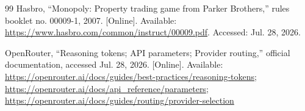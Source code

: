 \documentclass[conference]{IEEEtran}
\begin{document}
\begin{thebibliography}{99}
Hasbro, ``Monopoly: Property trading game from Parker Brothers,'' rules
booklet no. 00009-1, 2007. [Online]. Available:
\url{https://www.hasbro.com/common/instruct/00009.pdf}. Accessed:
Jul. 28, 2026.

OpenRouter, ``Reasoning tokens; API parameters; Provider routing,'' official
documentation, accessed Jul. 28, 2026. [Online]. Available:
\url{https://openrouter.ai/docs/guides/best-practices/reasoning-tokens};
\url{https://openrouter.ai/docs/api_reference/parameters};
\url{https://openrouter.ai/docs/guides/routing/provider-selection}

\end{thebibliography}
\end{document}
